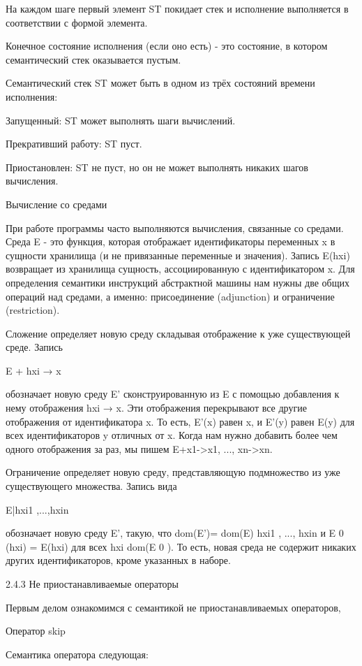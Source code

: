 На каждом шаге первый элемент ST покидает стек и исполнение выполняется в соответствии с формой элемента.

Конечное состояние исполнения (если оно есть) - это состояние, в котором семантический стек оказывается пустым.

Семантический стек ST может быть в одном из трёх состояний времени исполнения:

Запущенный: ST может выполнять шаги вычислений.

Прекративший работу: ST пуст.

Приостановлен: ST не пуст, но он не может выполнять никаких шагов вычисления.

Вычисление со средами

При работе программы часто выполняются вычисления, связанные со средами. Среда E - это функция, которая отображает идентификаторы переменных x в сущности хранилища (и не привязанные переменные и значения). Запись E(hxi) возвращает из хранилища сущность, ассоциированную с идентификатором x. Для определения семантики инструкций абстрактной машины нам нужны две общих операций над средами, а именно: присоединение (adjunction) и ограничение (restriction).

Сложение определяет новую среду складывая отображение к уже существующей среде. Запись

E + {hxi → x}

обозначает новую среду E' сконструированную из E с помощью добавления к нему отображения {hxi → x}. Эти отображения перекрывают все другие отображения от идентификатора x. То есть, E'(x) равен x, и E'(y) равен E(y) для всех идентификаторов y отличных от x. Когда нам нужно добавить более чем одного отображения за раз, мы пишем E+{x1->x1, ..., xn->xn}.

Ограничение определяет новую среду, представляющую подмножество из уже существующего множества. Запись вида

E|{hxi1 ,...,hxin }

обозначает новую среду E', такую, что dom(E')= dom(E)  {hxi1 , ..., hxin } и E 0 (hxi) = E(hxi) для всех hxi  dom(E 0 ). То есть, новая среда не содержит никаких других идентификаторов, кроме указанных в наборе.

2.4.3 Не приостанавливаемые операторы

Первым делом ознакомимся с семантикой не приостанавливаемых операторов,

Оператор skip

Семантика оператора следующая:

